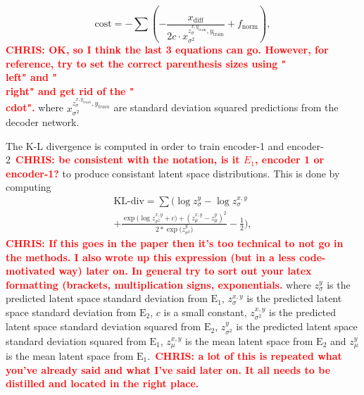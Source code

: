 \documentclass[%
showpacs,
 amsmath,amssymb,
 aps,
 twocolumn,
 prl,
 reprint,
floatfix,
]{revtex4-1}
\newcommand{\chris}[1]{\textbf{\textcolor{red}{CHRIS: #1}}}
\begin{document}
%
\begin{equation}
    \textrm{cost} = - \sum (-\frac{x_{\textrm{diff}}}{2c \cdot 
    x^{z^{x,y_{\textrm{train}}}_{\sigma},y_{\textrm{train}}}_{\sigma^{2}}} + f_{\textrm{norm}}),\label{eq:cost}
\end{equation}
%
\chris{OK, so I think the last 3 equations can go. However, for reference, try
to set the correct parenthesis sizes using "\\left" and "\\right" and get rid of
the "\\cdot".} where $x^{z^{x,y_{train}}_{\sigma},y_{train}}_{\sigma^{2}}$ are
standard deviation squared predictions from the decoder network.

%
%
The K-L divergence is computed in order to train encoder-1 and
encoder-2~\chris{be consistent with the notation, is it $E_{1}$, encoder 1 or
encoder-1?} to produce consistant latent space distributions. This is done by
computing 
%
\begin{equation}
    \begin{split}
    \textrm{KL-div} = \sum(\log{z^{y}_{\sigma}}-\log{z^{x,y}_{\sigma}} \\
    +\frac{\exp{(\log{z^{x,y}_{\sigma^{2}}+c)}}+(z^{x,y}_{\mu}-z^{y}_{\mu})^{2}}{2*\exp{(z^{y}_{\sigma^{2}}})}
    -\frac{1}{2}),\label{eq:kl}
    \end{split}
\end{equation}
%
\chris{If this goes in the paper then it's too technical to not go in the
methods. I also wrote up this expression (but in a less code-motivated way)
later on. In general try to sort out your latex formatting (brackets,
multiplication signs, exponentials.} where $z^{y}_{\sigma}$ is the predicted
latent space standard deviation from $\textrm{E}_1$, $z^{x,y}_{\sigma}$ is the
predicted latent space standard deviation from $\textrm{E}_2$, $c$ is a small
constant, $z^{x,y}_{\sigma^{2}}$ is the predicted latent space standard
deviation squared from $\textrm{E}_2$, $z^{y}_{\sigma^{2}}$ is the predicted
latent space standard deviation squared from $\textrm{E}_1$, $z^{x,y}_{\mu}$ is
the mean latent space from $\textrm{E}_2$ and $z^{y}_{\mu}$ is the mean latent
space from $\textrm{E}_1$.~\chris{a lot of this is repeated what you've already
said and what I've said later on. It all needs to be distilled and located in
the right place.}
\end{document}
